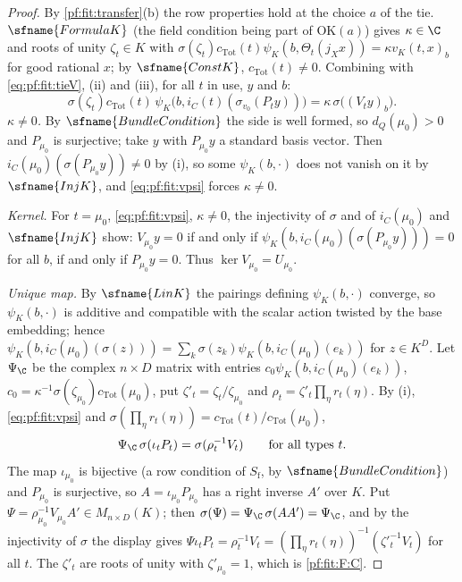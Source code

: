 \begin{proof}
By \cref{pf:fit:transfer}(b) the row properties hold at the choice $a$ of the tie. $\sfname{FormulaK}$ (the field condition
being part of $\mathrm{OK}(a)$) gives $\kappa\in\C$ and roots of unity $\zeta_t\in K$ with
$\sigma(\zeta_t)c_{\mathrm{Tot}}(t)\psi_K(b,\Theta_t(j_Xx))=\kappa v_K(t,x)_b$ for good rational $x$; by $\sfname{ConstK}$,
$c_{\mathrm{Tot}}(t)\ne0$. Combining with \eqref{eq:pf:fit:tieV}, (ii) and (iii), for all $t$ in use, $y$ and $b$:
\begin{equation}\label{eq:pf:fit:vpsi}
\sigma(\zeta_t)c_{\mathrm{Tot}}(t)\,\psi_K\bigl(b,i_C(t)(\sigma_{v_0}(P_ty))\bigr)=\kappa\,\sigma\bigl((V_ty)_b\bigr).
\end{equation}
\emph{$\kappa\ne0$.} By $\sfname{BundleCondition}$ the side is well formed, so $d_Q(\mu_0)>0$ and $P_{\mu_0}$ is surjective;
take $y$ with $P_{\mu_0}y$ a standard basis vector. Then $i_C(\mu_0)(\sigma(P_{\mu_0}y))\ne0$ by (i), so some
$\psi_K(b,\cdot)$ does not vanish on it by $\sfname{InjK}$, and \eqref{eq:pf:fit:vpsi} forces $\kappa\ne0$.

\emph{Kernel.} For $t=\mu_0$, \eqref{eq:pf:fit:vpsi}, $\kappa\ne0$, the injectivity of $\sigma$ and of $i_C(\mu_0)$ and
$\sfname{InjK}$ show: $V_{\mu_0}y=0$ if and only if $\psi_K(b,i_C(\mu_0)(\sigma(P_{\mu_0}y)))=0$ for all $b$, if and only if
$P_{\mu_0}y=0$. Thus $\ker V_{\mu_0}=U_{\mu_0}$.

\emph{Unique map.} By $\sfname{LinK}$ the pairings defining $\psi_K(b,\cdot)$ converge, so $\psi_K(b,\cdot)$ is additive and
compatible with the scalar action twisted by the base embedding; hence
$\psi_K(b,i_C(\mu_0)(\sigma(z)))=\sum_k\sigma(z_k)\psi_K(b,i_C(\mu_0)(e_k))$ for $z\in K^D$. Let $\Psi_{\C}$ be the complex
$n\times D$ matrix with entries $c_0\psi_K(b,i_C(\mu_0)(e_k))$, $c_0=\kappa^{-1}\sigma(\zeta_{\mu_0})c_{\mathrm{Tot}}(\mu_0)$, put
$\zeta'_t=\zeta_t/\zeta_{\mu_0}$ and $\rho_t=\zeta'_t\prod_\eta r_t(\eta)$. By (i), \eqref{eq:pf:fit:vpsi} and
$\sigma(\prod_\eta r_t(\eta))=c_{\mathrm{Tot}}(t)/c_{\mathrm{Tot}}(\mu_0)$,
\[
\Psi_{\C}\,\sigma(\iota_tP_t)=\sigma(\rho_t^{-1}V_t)\qquad\text{for all types }t.
\]
The map $\iota_{\mu_0}$ is bijective (a row condition of $S_{\mathrm f}$, by $\sfname{BundleCondition}$) and $P_{\mu_0}$ is
surjective, so $A=\iota_{\mu_0}P_{\mu_0}$ has a right inverse $A'$ over $K$. Put $\Psi=\rho_{\mu_0}^{-1}V_{\mu_0}A'\in
M_{n\times D}(K)$; then $\sigma(\Psi)=\Psi_{\C}\,\sigma(AA')=\Psi_{\C}$, and by the injectivity of $\sigma$ the display gives
$\Psi\iota_tP_t=\rho_t^{-1}V_t=(\prod_\eta r_t(\eta))^{-1}(\zeta'^{-1}_tV_t)$ for all $t$. The $\zeta'_t$ are roots of unity
with $\zeta'_{\mu_0}=1$, which is \ref{pf:fit:F:C}.
\end{proof}

